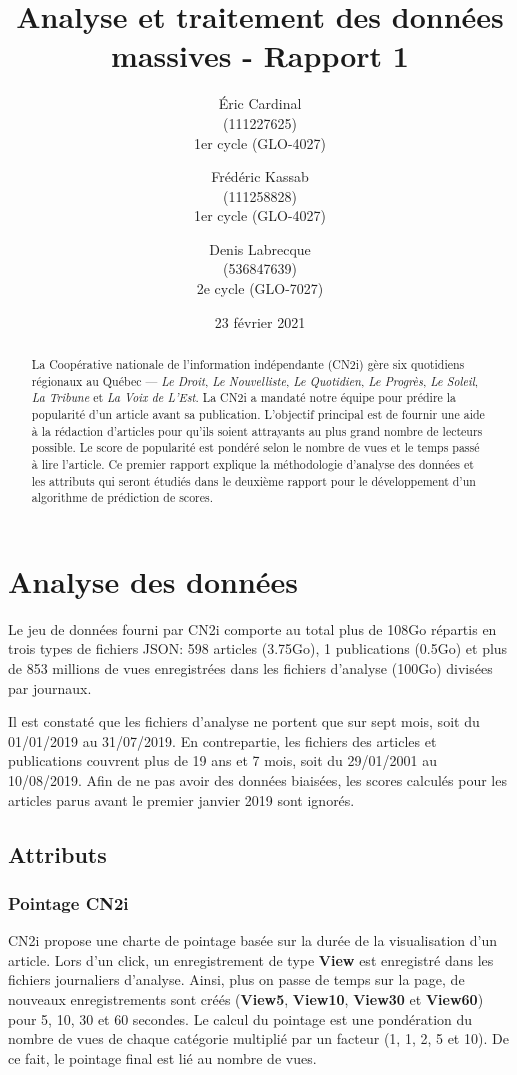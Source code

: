 \documentclass[french]{article}
\title{Analyse et traitement des données massives - Rapport 1}
\author{Éric Cardinal \\ 
(111227625) \\
1er cycle (GLO-4027)
\and
Frédéric Kassab\\ 
(111258828) \\
1er cycle (GLO-4027)
\and
Denis Labrecque \\
(536847639) \\
2e cycle (GLO-7027)
}
\date{23 février 2021}
\begin{document}
\maketitle

\begin{abstract}
La Coopérative nationale de l'information indépendante (CN2i) gère six quotidiens régionaux au Québec --- \emph{Le Droit}, \emph{Le Nouvelliste}, \emph{Le Quotidien}, \emph{Le Progrès}, \emph{Le Soleil}, \emph{La Tribune} et \emph{La Voix de L'Est}. La CN2i a mandaté notre équipe pour prédire la popularité d'un article avant sa publication. L'objectif principal est de fournir une aide à la rédaction d'articles pour qu'ils soient attrayants au plus grand nombre de lecteurs possible. Le score de popularité est pondéré selon le nombre de vues et le temps passé à lire l'article. Ce premier rapport explique la méthodologie d'analyse des données et les attributs qui seront étudiés dans le deuxième rapport pour le développement d'un algorithme de prédiction de scores.
\end{abstract}

\section{Analyse des données}

Le jeu de données fourni par CN2i comporte au total plus de 108Go répartis en trois types de fichiers JSON: 598 articles (3.75Go), 1 publications (0.5Go) et plus de 853 millions de vues enregistrées dans les fichiers d’analyse (100Go) divisées par journaux.

Il est constaté que les fichiers d’analyse ne portent que sur sept mois, soit du 01/01/2019 au 31/07/2019. En contrepartie, les fichiers des articles et publications couvrent plus de 19 ans et 7 mois, soit du 29/01/2001 au 10/08/2019. Afin de ne pas avoir des données biaisées, les scores calculés pour les articles parus avant le premier janvier 2019 sont ignorés.
\subsection{Attributs}
\subsubsection{Pointage CN2i}
CN2i propose une charte de pointage basée sur la durée de la visualisation d'un article. Lors d'un click, un enregistrement de type \textbf{View} est enregistré dans les fichiers journaliers d'analyse. Ainsi, plus on passe de temps sur la page, de nouveaux enregistrements sont créés (\textbf{View5}, \textbf{View10}, \textbf{View30} et \textbf{View60}) pour 5, 10, 30 et 60 secondes. Le calcul du pointage est une pondération du nombre de vues de chaque catégorie multiplié par un facteur (1, 1, 2, 5 et 10). De ce fait, le pointage final est lié au nombre de vues.
\end{document}
